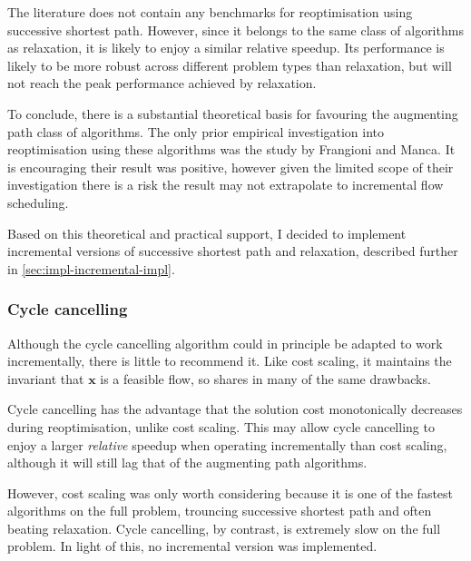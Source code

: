 The literature does not contain any benchmarks for reoptimisation using successive shortest path. However, since it belongs to the same class of algorithms as relaxation, it is likely to enjoy a similar relative speedup. Its performance is likely to be more robust across different problem types than relaxation, but will not reach the peak performance achieved by relaxation.

To conclude, there is a substantial theoretical basis for favouring the augmenting path class of algorithms. The only prior empirical investigation into reoptimisation using these algorithms was the study by Frangioni and Manca. It is encouraging their result was positive, however given the limited scope of their investigation there is a risk the result may not extrapolate to incremental flow scheduling.

Based on this theoretical and practical support, I decided to implement incremental versions of successive shortest path and relaxation, described further in \cref{sec:impl-incremental-impl}.

\subsubsection{Cycle cancelling}

Although the cycle cancelling algorithm could in principle be adapted to work incrementally, there is little to recommend it. Like cost scaling, it maintains the invariant that $\mathbf{x}$ is a feasible flow, so shares in many of the same drawbacks.  

Cycle cancelling has the advantage that the solution cost monotonically decreases during reoptimisation, unlike cost scaling\footnotemark. This may allow cycle cancelling to enjoy a larger \emph{relative} speedup when operating incrementally than cost scaling, although it will still lag that of the augmenting path algorithms.

However, cost scaling was only worth considering because it is one of the fastest algorithms on the full problem, trouncing successive shortest path and often beating relaxation. Cycle cancelling, by contrast, is extremely slow on the full problem. In light of this, no incremental version was implemented.

